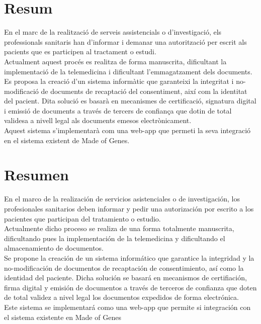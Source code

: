 \chapter*{Resum}
En el marc de la realització de serveis assistencials o d'investigació, els professionals sanitaris han d'informar i demanar una autorització per escrit als pacients que es participen al tractament o estudi.\\ \newline Actualment aquest procés es realitza de forma manuscrita, dificultant la implementació de la telemedicina i dificultant l’emmagatzament dels documents.\\
\newline Es proposa la creació d'un sistema informàtic que garanteixi la integritat i no-modificació de documents de recaptació del consentiment, així com la identitat del pacient. Dita solució es basarà en mecanismes de certificació, signatura digital i emissió de documents a través de tercers de confiança que dotin de total validesa a nivell legal als documents emesos electrònicament.\\
\newline Aquest sistema s’implementarà com una web-app que permeti la seva integració en el sistema existent de Made of Genes.
\clearpage
\chapter*{Resumen}
En el marco de la realización de servicios asistenciales o de investigación, los profesionales sanitarios deben informar y pedir una autorización por escrito a los pacientes que participan del tratamiento o estudio.\\
\newline Actualmente dicho proceso se realiza de una forma totalmente manuscrita, dificultando pues la implementación de la telemedicina y dificultando el almacenamiento de documentos.\\
\newline Se propone la creación de un sistema informático que garantice la integridad y la no-modificación de documentos de recaptación de consentimiento, así como la identidad del paciente. Dicha solución se basará en mecanismos de certifiación, firma digital y emisión de documentos a través de terceros de confianza que doten de total validez a nivel legal los documentos expedidos de forma electrónica.\\
\newline Este sistema se implementará como una web-app que permite si integración con el sistema existente en Made of Genes
\clearpage
